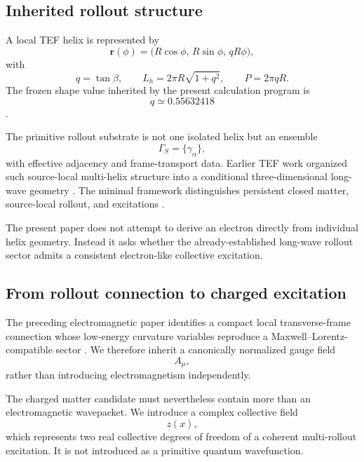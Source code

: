 \documentclass[11pt]{article}
\begin{document}
\subsection{Inherited rollout structure}

A local TEF helix is represented by
\begin{equation}
\bm r(\phi)
=
\bigl(
R\cos\phi,\,
R\sin\phi,\,
qR\phi
\bigr),
\end{equation}
with
\begin{equation}
q=\tan\beta,
\qquad
L_h=2\pi R\sqrt{1+q^2},
\qquad
P=2\pi qR.
\end{equation}
The frozen shape value inherited by the present calculation program is
\begin{equation}
q\simeq0.55632418
\end{equation}
\cite{WuHelix2026}.

The primitive rollout substrate is not one isolated helix but an ensemble
\begin{equation}
\Gamma_S=\{\gamma_\alpha\},
\end{equation}
with effective adjacency and frame-transport data. Earlier TEF work organized such source-local multi-helix structure into a conditional three-dimensional long-wave geometry \cite{WuGeometry2026}. The minimal framework distinguishes persistent closed matter, source-local rollout, and excitations \cite{WuFramework2026}.

The present paper does not attempt to derive an electron directly from individual helix geometry. Instead it asks whether the already-established long-wave rollout sector admits a consistent electron-like collective excitation.

\subsection{From rollout connection to charged excitation}

The preceding electromagnetic paper identifies a compact local transverse-frame connection whose low-energy curvature variables reproduce a Maxwell--Lorentz-compatible sector \cite{WuEM2026}. We therefore inherit a canonically normalized gauge field
\begin{equation}
A_\mu,
\end{equation}
rather than introducing electromagnetism independently.

The charged matter candidate must nevertheless contain more than an electromagnetic wavepacket. We introduce a complex collective field
\begin{equation}
z(x),
\end{equation}
which represents two real collective degrees of freedom of a coherent multi-rollout excitation. It is not introduced as a primitive quantum wavefunction.
\end{document}
